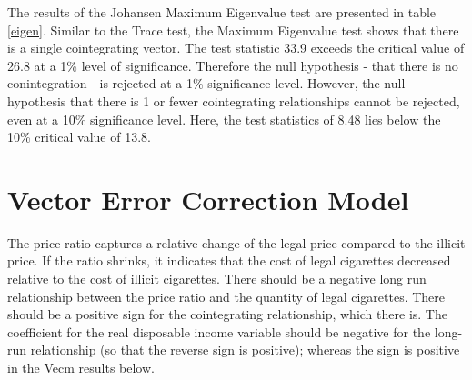 \documentclass[12pt,afrikaans, english,letterpaper,oneside,
openany]{memoir}
\begin{document}
The results of the Johansen Maximum Eigenvalue test are presented in
table \ref{eigen}. Similar to the Trace test, the Maximum Eigenvalue
test shows that there is a single cointegrating vector. The test
statistic 33.9 exceeds the critical value of 26.8 at a 1\% level of
significance. Therefore the null hypothesis - that there is no
conintegration - is rejected at a 1\% significance level. However, the
null hypothesis that there is 1 or fewer cointegrating relationships
cannot be rejected, even at a 10\% significance level. Here, the test
statistics of 8.48 lies below the 10\% critical value of 13.8.

\hypertarget{vector-error-correction-model}{%
\section{\texorpdfstring{Vector Error Correction Model
\label{vecm}}{Vector Error Correction Model }}\label{vector-error-correction-model}}

The price ratio captures a relative change of the legal price compared
to the illicit price. If the ratio shrinks, it indicates that the cost
of legal cigarettes decreased relative to the cost of illicit
cigarettes. There should be a negative long run relationship between the
price ratio and the quantity of legal cigarettes. There should be a
positive sign for the cointegrating relationship, which there is. The
coefficient for the real disposable income variable should be negative
for the long-run relationship (so that the reverse sign is positive);
whereas the sign is positive in the Vecm results below.

 
  \providecommand{\huxb}[2]{\arrayrulecolor[RGB]{#1}\global\arrayrulewidth=#2pt}
  \providecommand{\huxvb}[2]{\color[RGB]{#1}\vrule width #2pt}
  \providecommand{\huxtpad}[1]{\rule{0pt}{#1}}
  \providecommand{\huxbpad}[1]{\rule[-#1]{0pt}{#1}}
\end{document}
